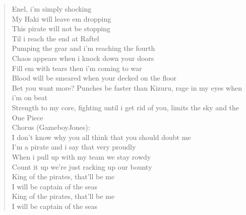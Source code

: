 \documentclass[11pt]{article}
\begin{document}
\begin{verse}
Enel, i'm simply shocking\\
My Haki will leave em dropping\\
This pirate will not be stopping\\
Til i reach the end at Raftel\\
Pumping the gear and i'm reaching the fourth\\
Chaos appears when i knock down your doors\\
Fill em with tears then i'm coming to war\\
Blood will be smeared when your decked on the floor\\
Bet you want more? Punches be faster than Kizuru, rage in my eyes when i'm on beat\\
Strength to my core, fighting until i get rid of you, limits the sky and the One Piece\\
Chorus (GameboyJones):\\
I don't know why you all think that you should doubt me\\
I'm a pirate and i say that very proudly\\
When i pull up with my team we stay rowdy\\
Count it up we're just racking up our bounty\\
King of the pirates, that'll be me\\
I will be captain of the seas\\
King of the pirates, that'll be me\\
I will be captain of the seas\\
\end{verse}
\clearpage
\end{document}
